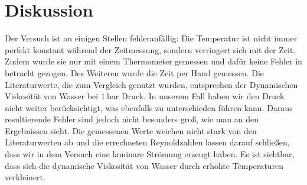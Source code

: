 \documentclass[titlepage=firstiscover, bibliography=totoc, captions=tableheading]{scrartcl}
\begin{document}
\section{Diskussion}
Der Versuch ist an einigen Stellen fehleranfällig: Die Temperatur ist nicht
immer perfekt konstant während der Zeitmessung, sondern verringert sich mit
der Zeit. Zudem wurde sie nur mit einem Thermometer gemessen und dafür keine Fehler
in betracht gezogen. Des Weiteren wurde die Zeit per Hand gemessen.
Die Literaturwerte, die zum Vergleich genutzt wurden, entsprechen der Dynamischen
Viskosität von Wasser bei $\SI{1}{\bar}$ Druck. In unserem Fall haben wir den Druck nicht
weiter berücksichtigt, was ebenfalls zu unterschieden führen kann.
Daraus resultierende Fehler sind jedoch nicht besonders groß, wie man an den
Ergebnissen sieht.
Die gemessenen Werte weichen nicht stark von den Literaturwerten ab
und die errechneten Reynoldzahlen lassen darauf schließen, dass wir in dem
Versuch eine laminare Strömung erzeugt haben.
Es ist sichtbar, dass sich die dynamische Viskosität von Wasser durch erhöhte
Temperaturen verkleinert.
\nocite{*}
\printbibliography
\end{document}
